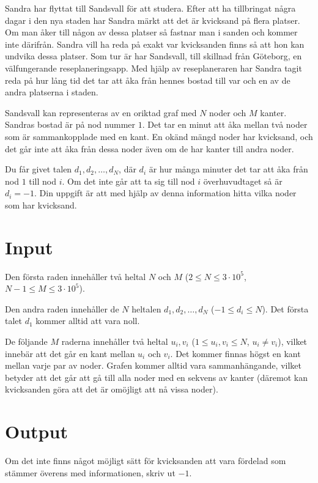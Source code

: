 \noindent

Sandra har flyttat till Sandsvall för att studera. Efter att ha tillbringat några dagar i den
nya staden har Sandra märkt att det är kvicksand på flera platser. 
Om man åker till någon av dessa platser så fastnar man i sanden och kommer inte därifrån.
Sandra vill ha reda på exakt var kvicksanden finns så att hon kan undvika dessa platser.
Som tur är har Sandsvall, till skillnad från Göteborg, en välfungerande reseplaneringsapp.
Med hjälp av reseplaneraren har Sandra tagit reda på hur lång tid det tar att åka från 
hennes bostad till var och en av de andra platserna i staden.

Sandsvall kan representeras av en oriktad graf med $N$ noder och $M$ kanter. Sandras bostad
är på nod nummer $1$. Det tar en minut att åka mellan två noder som är sammankopplade med en kant.
En okänd mängd noder har kvicksand, och det går inte att åka från dessa noder även om de har kanter
till andra noder.

Du får givet talen $d_1, d_2, \dots, d_N$, där $d_i$ är hur många minuter det tar att åka från 
nod $1$ till nod $i$. Om det inte går att ta sig till nod $i$ överhuvudtaget så är $d_i = -1$.
Din uppgift är att med hjälp av denna information hitta vilka noder som har kvicksand.

\section*{Input}

Den första raden innehåller två heltal $N$ och $M$ ($2 \leq N \leq 3 \cdot 10^5$, $N-1 \leq M \leq 3 \cdot 10^5$).

Den andra raden innehåller de $N$ heltalen $d_1, d_2, \dots, d_N$ ($-1 \leq d_i \leq N$). Det första talet
$d_1$ kommer alltid att vara noll.

De följande $M$ raderna innehåller två heltal $u_i, v_i$ ($1 \leq u_i, v_i \leq N$, $u_i \neq v_i$), vilket innebär
att det går en kant mellan $u_i$ och $v_i$. Det kommer finnas högst en kant mellan varje par av noder.
Grafen kommer alltid vara sammanhängande, vilket betyder att det går att gå till alla noder 
med en sekvens av kanter (däremot kan kvicksanden göra att det är omöjligt att nå vissa noder).

\section*{Output}

Om det inte finns något möjligt sätt för kvicksanden att vara fördelad som stämmer överens med 
informationen, skriv ut $-1$.

